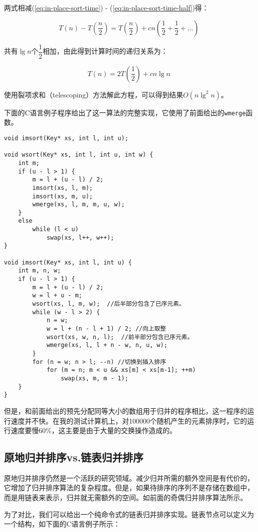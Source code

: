 \documentclass{ctexart}
\begin{document}
两式相减(\ref{eq:in-place-sort-time}) - (\ref{eq:in-place-sort-time-half})得：

\[
T(n) - T(\frac{n}{2}) = T(\frac{n}{2}) + c n (\frac{1}{2} + \frac{1}{2} + ... )
\]

共有$\lg n$个$\dfrac{1}{2}$相加，由此得到计算时间的递归关系为：

\[
T(n) = 2 T(\frac{1}{2}) + c n \lg n
\]

使用裂项求和（telescoping）方法解此方程，可以得到结果$O(n \lg^2 n)$。

下面的C语言例子程序给出了这一算法的完整实现，它使用了前面给出的\texttt{wmerge}函数。

\lstset{language=C}
\begin{lstlisting}
void imsort(Key* xs, int l, int u);

void wsort(Key* xs, int l, int u, int w) {
    int m;
    if (u - l > 1) {
        m = l + (u - l) / 2;
        imsort(xs, l, m);
        imsort(xs, m, u);
        wmerge(xs, l, m, m, u, w);
    }
    else
        while (l < u)
            swap(xs, l++, w++);
}

void imsort(Key* xs, int l, int u) {
    int m, n, w;
    if (u - l > 1) {
        m = l + (u - l) / 2;
        w = l + u - m;
        wsort(xs, l, m, w);  //后半部分包含了已序元素。
        while (w - l > 2) {
            n = w;
            w = l + (n - l + 1) / 2; //向上取整
            wsort(xs, w, n, l);  //前半部分包含已序元素。
            wmerge(xs, l, l + n - w, n, u, w);
        }
        for (n = w; n > l; --n) //切换到插入排序
            for (m = n; m < u && xs[m] < xs[m-1]; ++m)
                swap(xs, m, m - 1);
    }
}
\end{lstlisting}

但是，和前面给出的预先分配同等大小的数组用于归并的程序相比，这一程序的运行速度并不快。在我的测试计算机上，对100000个随机产生的元素排序时，它的运行速度要慢60\%，这主要是由于大量的交换操作造成的。

\subsection{原地归并排序vs.链表归并排序}

原地归并排序仍然是一个活跃的研究领域。减少归并所需的额外空间是有代价的，它增加了归并排序算法的复杂程度。但是，如果待排序的序列不是存储在数组中，而是用链表来表示，归并就无需额外的空间。如前面的奇偶归并排序算法所示。

为了对比，我们可以给出一个纯命令式的链表归并排序实现。链表节点可以定义为一个结构，如下面的C语言例子所示：
\end{document}
